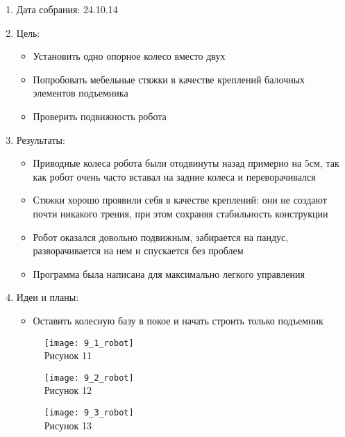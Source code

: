 \documentclass[11pt]{article}
\begin{document}
	\begin{enumerate}
		\item Дата собрания: 24.10.14
		\item Цель:
		\begin{itemize}
			\item Установить одно опорное колесо вместо двух
			\item Попробовать мебельные стяжки в качестве креплений балочных элементов подъемника
			\item Проверить подвижность робота
		\end{itemize}			
		\item Результаты:
		\begin{itemize}
			\item Приводные колеса робота были отодвинуты назад примерно на 5см, так как робот очень часто вставал на задние колеса и переворачивался
			\item Стяжки хорошо проявили себя в качестве креплений: они не создают почти никакого трения, при этом сохраняя стабильность конструкции
			\item Робот оказался довольно подвижным, забирается на пандус, разворачивается на нем и спускается без проблем
			\item Программа была написана для максимально легкого управления
		\end{itemize}
		\item Идеи и планы:
		\begin{itemize}
			\item Оставить колесную базу в покое и начать строить только подъемник
		\end{itemize}
		\begin{figure} [h]
			\centering
			\begin{minipage}{0.3\linewidth}
				\texttt{[image: 9\_1\_robot]}\\ Рисунок 11
			\end{minipage}
			\begin{minipage}{0.3\linewidth}
				\texttt{[image: 9\_2\_robot]}\\ Рисунок 12
			\end{minipage}
			\begin{minipage}{0.3\linewidth}
				\texttt{[image: 9\_3\_robot]}\\ Рисунок 13
			\end{minipage}
		\end{figure}
	\end{enumerate}
\end{document}
